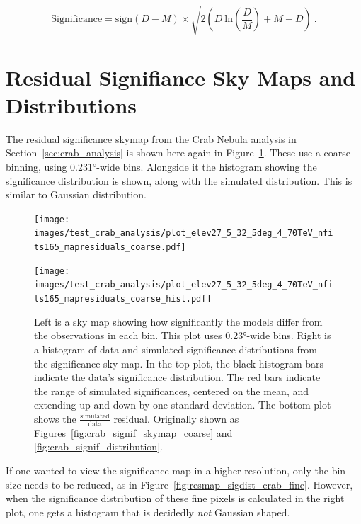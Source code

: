 \begin{equation}\label{eqn:resmap_signif2}
  \textrm{Significance} = \textrm{sign}(D-M) \times \sqrt{ 2 \left ( D \: \textrm{ln} \left ( \frac{D}{M} \right ) + M - D \right ) } \,.
\end{equation}

\section{Residual Signifiance Sky Maps and Distributions}

The residual significance skymap from the Crab Nebula analysis in Section~\ref{sec:crab_analysis} is shown here again in Figure~\ref{fig:resmap_sigdist_crab_coarse}.
These use a coarse binning, using \ang{0.231}-wide bins.
Alongside it the histogram showing the significance distribution is shown, along with the simulated distribution.
This is similar to Gaussian distribution.

\begin{figure}[h]
  \centering
  \hfill
  \begin{minipage}{0.4\textwidth}
    \centering
    \texttt{[image: images/test\_crab\_analysis/plot\_elev27\_5\_32\_5deg\_4\_70TeV\_nfits165\_mapresiduals\_coarse.pdf]}
  \end{minipage}
  \hfill
  \begin{minipage}{0.45\textwidth}
    \centering
    \texttt{[image: images/test\_crab\_analysis/plot\_elev27\_5\_32\_5deg\_4\_70TeV\_nfits165\_mapresiduals\_coarse\_hist.pdf]}
  \end{minipage}
  \hfill
  \hfill
  \caption[Crab Residual Sky Map and Distribution, Coarse Binning]{
    Left is a sky map showing how significantly the models differ from the observations in each bin.
    This plot uses \ang{0.23}-wide bins.
    Right is a histogram of data and simulated significance distributions from the significance sky map.
    In the top plot, the black histogram bars indicate the data's significance distribution.
    The red bars indicate the range of simulated significances, centered on the mean, and extending up and down by one standard deviation.
    The bottom plot shows the $\frac{\textrm{simulated}}{\textrm{data}}$ residual.
    Originally shown as Figures~\ref{fig:crab_signif_skymap_coarse} and \ref{fig:crab_signif_distribution}.
  }
  \label{fig:resmap_sigdist_crab_coarse}
\end{figure}

If one wanted to view the significance map in a higher resolution, only the bin size needs to be reduced, as in Figure~\ref{fig:resmap_sigdist_crab_fine}.
However, when the significance distribution of these fine pixels is calculated in the right plot, one gets a histogram that is decidedly \textit{not} Gaussian shaped.

